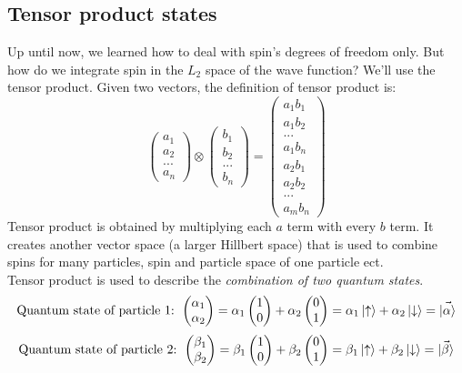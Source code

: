 \subsection{Tensor product states}
Up until now, we learned how to deal with spin's degrees of freedom only. But how do we integrate spin in the $L_2$ space of the wave function? We'll use the tensor product. Given two vectors, the definition of tensor product is:
\[
\begin{pmatrix}a_1\\a_2\\...\\a_n\end{pmatrix}\otimes\begin{pmatrix}b_1\\b_2\\...\\b_n\end{pmatrix}=\begin{pmatrix}a_1b_1\\a_1b_2\\...\\a_1b_n\\a_2b_1\\a_2b_2\\...\\a_mb_n\end{pmatrix}
\]
Tensor product is obtained by multiplying each $a$ term with every $b$ term. It creates another vector space (a larger Hillbert space) that is used to combine spins for many particles, spin and particle space of one particle ect.\\
Tensor product is used to describe the \emph{combination of two quantum states}.
\[\text{Quantum state of particle 1: } \begin{pmatrix}\alpha_1\\\alpha_2\end{pmatrix}=\alpha_1\begin{pmatrix}1\\0\end{pmatrix}+\alpha_2\begin{pmatrix}0\\1\end{pmatrix}=\alpha_1\ket{\uparrow}+\alpha_2\ket{\downarrow}=\vec{\ket\alpha}\]
\[\text{Quantum state of particle 2: } \begin{pmatrix}\beta_1\\\beta_2\end{pmatrix}=\beta_1\begin{pmatrix}1\\0\end{pmatrix}+\beta_2\begin{pmatrix}0\\1\end{pmatrix}=\beta_1\ket{\uparrow}+\beta_2\ket{\downarrow}=\vec{\ket{\beta}}\]
